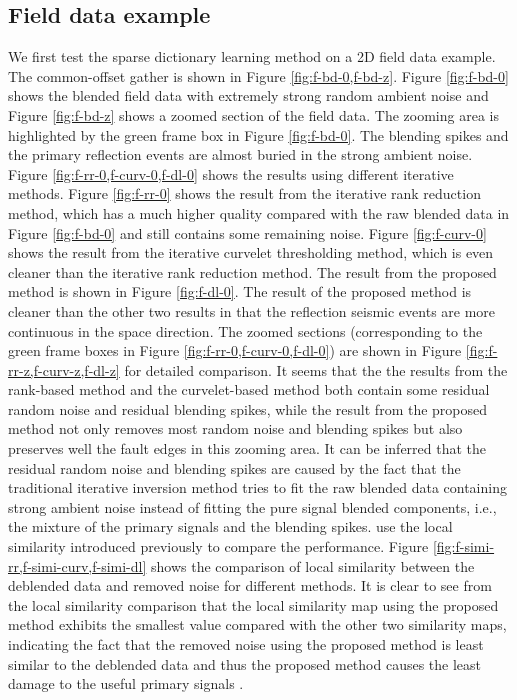 \subsection{Field data example}
We first test the sparse dictionary learning method on a 2D field data example. The common-offset gather is shown in Figure \ref{fig:f-bd-0,f-bd-z}. Figure \ref{fig:f-bd-0} shows the blended field data with extremely strong random ambient noise and Figure \ref{fig:f-bd-z} shows a zoomed section of the field data. The zooming area is highlighted by the green frame box in Figure \ref{fig:f-bd-0}. The blending spikes and the primary reflection events are almost buried in the strong ambient noise. Figure \ref{fig:f-rr-0,f-curv-0,f-dl-0} shows the results using different iterative methods. Figure \ref{fig:f-rr-0} shows the result from the iterative rank reduction method, which has a much higher quality compared with the raw blended data in Figure \ref{fig:f-bd-0} and still contains some remaining noise. Figure \ref{fig:f-curv-0} shows the result from the iterative curvelet thresholding method, which is even cleaner than the iterative rank reduction method. The result from the proposed method is shown in Figure \ref{fig:f-dl-0}. The result of the proposed method is cleaner than the other two results in that the reflection seismic events are more continuous in the space direction. The zoomed sections (corresponding to the green frame boxes in Figure \ref{fig:f-rr-0,f-curv-0,f-dl-0}) are shown in Figure \ref{fig:f-rr-z,f-curv-z,f-dl-z} for detailed comparison. It seems that the the results from the rank-based method and the curvelet-based method both contain some residual random noise and residual blending spikes, while the result from the proposed method not only removes most random noise and blending spikes but also preserves well the fault edges in this zooming area. It can be inferred that the residual random noise and blending spikes are caused by the fact that the traditional iterative inversion method tries to fit the raw blended data containing strong ambient noise instead of fitting the pure signal blended components, i.e., the mixture of the primary signals and the blending spikes.   use the local similarity introduced previously to compare the performance. Figure \ref{fig:f-simi-rr,f-simi-curv,f-simi-dl} shows the comparison of local similarity between the deblended data and removed noise for different methods. It is clear to see from the local similarity comparison that the local similarity map using the proposed method exhibits the smallest value compared with the other two similarity maps, indicating the fact that the removed noise using the proposed method is least similar to the deblended data and thus the proposed method causes the least damage to the useful primary signals \cite[]{yangkang2015ortho}.

